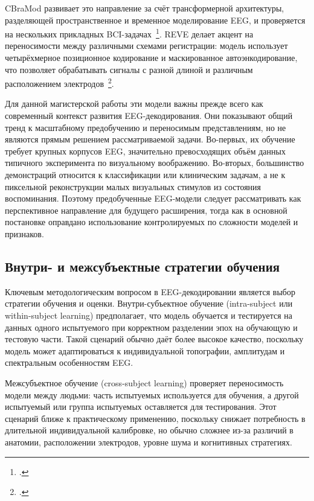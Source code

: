 CBraMod развивает это направление за счёт трансформерной архитектуры, разделяющей пространственное и временное моделирование EEG, и проверяется на нескольких прикладных BCI-задачах~\footcite{10.48550/arXiv.2412.07236}. REVE делает акцент на переносимости между различными схемами регистрации: модель использует четырёхмерное позиционное кодирование и маскированное автоэнкодирование, что позволяет обрабатывать сигналы с разной длиной и различным расположением электродов~\footcite{10.48550/arXiv.2510.21585}.

Для данной магистерской работы эти модели важны прежде всего как современный контекст развития EEG-декодирования. Они показывают общий тренд к масштабному предобучению и переносимым представлениям, но не являются прямым решением рассматриваемой задачи. Во-первых, их обучение требует крупных корпусов EEG, значительно превосходящих объём данных типичного эксперимента по визуальному воображению. Во-вторых, большинство демонстраций относится к классификации или клиническим задачам, а не к пиксельной реконструкции малых визуальных стимулов из состояния воспоминания. Поэтому предобученные EEG-модели следует рассматривать как перспективное направление для будущего расширения, тогда как в основной постановке оправдано использование контролируемых по сложности моделей и признаков.

\subsection{Внутри- и межсубъектные стратегии обучения}

Ключевым методологическим вопросом в EEG-декодировании является выбор стратегии обучения и оценки. Внутри-субъектное обучение (intra-subject или within-subject learning) предполагает, что модель обучается и тестируется на данных одного испытуемого при корректном разделении эпох на обучающую и тестовую части. Такой сценарий обычно даёт более высокое качество, поскольку модель может адаптироваться к индивидуальной топографии, амплитудам и спектральным особенностям EEG.

Межсубъектное обучение (cross-subject learning) проверяет переносимость модели между людьми: часть испытуемых используется для обучения, а другой испытуемый или группа испытуемых оставляется для тестирования. Этот сценарий ближе к практическому применению, поскольку снижает потребность в длительной индивидуальной калибровке, но обычно сложнее из-за различий в анатомии, расположении электродов, уровне шума и когнитивных стратегиях.

